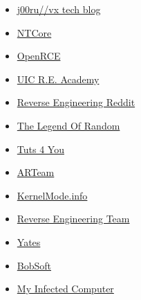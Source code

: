 \begin{itemize}
\item \href{http://j00ru.vexillium.org/}{j00ru//vx tech blog}\\
\item \href{http://ntcore.com}{NTCore}\\
\item \href{http://openrce.org}{OpenRCE}\\
\item \href{http://quequero.org/}{UIC R.E. Academy}\\
\item \href{http://reddit.com/r/ReverseEngineering}{Reverse Engineering Reddit}\\
\item \href{http://thelegendofrandom.com/blog/}{The Legend Of Random}\\
\item \href{http://tuts4you.com}{Tuts 4 You}\\
\item \href{http://www.accessroot.com}{ARTeam}\\
\item \href{http://www.kernelmode.info/forum/index.php}{KernelMode.info}\\
\item \href{http://www.reteam.org}{Reverse Engineering Team}\\
\item \href{http://www.reverse-engineering.info}{Yates}\\
\item \href{http://www.woodmann.com/BobSoft/}{BobSoft}\\
\item \href{http://zairon.wordpress.com}{My Infected Computer}\\
\end{itemize}